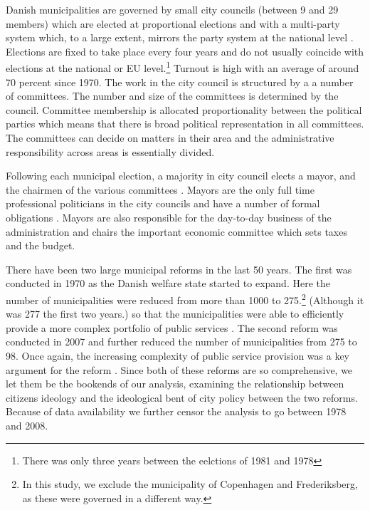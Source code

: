\documentclass[a4paper,12pt]{article}
\begin{document}
Danish municipalities are governed by small city councils (between 9 and 29 members) which are elected at proportional elections and with a multi-party system which, to a large extent, mirrors the party system at the national level \citep{blom2013et}. Elections are fixed to take place every four years and do not usually coincide with elections at the national or EU level.\footnote{There was only three years between the eelctions of 1981 and 1978} Turnout is high with an average of around 70 percent since 1970.  The work in the city council is structured by a a number of committees. The number and size of the committees is determined by the council. Committee membership is allocated proportionality between the political parties which means that there is broad political representation in all committees. The committees can decide on matters in their area and the administrative responsibility across areas is essentially divided. 

Following each municipal election, a majority in city council elects a mayor, and the chairmen of the various committees \citep{serritzlew2008explaining}. Mayors are the only full time professional politicians in the city councils and have a number of formal obligations \citep{kjaer2015urban}. Mayors are also responsible for the day-to-day business of the administration and chairs the important economic committee which sets taxes and the budget.


There have been two large municipal reforms in the last 50 years. The first was conducted in 1970 as the Danish welfare state started to expand. Here the number of municipalities were reduced from more than 1000 to 275.\footnote{In this study, we exclude the municipality of Copenhagen and Frederiksberg, as these were governed in a different way.} (Although it was 277 the first two years.) so that the municipalities were able to efficiently provide a more complex portfolio of public services \citep{ingvartsen1991kommunalreformen}. The second reform was conducted in 2007 and further reduced the number of municipalities from 275 to 98. Once again, the increasing complexity of public service provision was a key argument for the reform \citep{christiansen2008utaenkelige}. Since both of these reforms are so comprehensive, we let them be the bookends of our analysis, examining the relationship between citizens ideology and the ideological bent of city policy between the two reforms. Because of data availability we further censor the analysis to go between 1978 and 2008.
\end{document}

